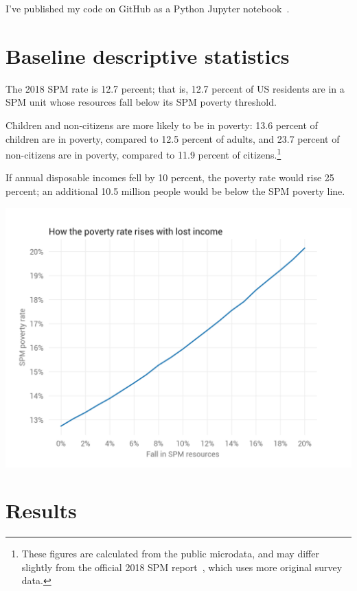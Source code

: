 \documentclass[12pt]{article}
\begin{document}
I've published my code on GitHub as a Python Jupyter notebook~\cite{notebook}.


\section{Baseline descriptive statistics} \label{sec:baseline_descriptive_statistics}

The 2018 SPM rate is 12.7 percent; that is, 12.7 percent of US residents are in a SPM unit whose resources fall below its SPM poverty threshold.

Children and non-citizens are more likely to be in poverty: 13.6 percent of children are in poverty, compared to 12.5 percent of adults, and 23.7 percent of non-citizens are in poverty, compared to 11.9 percent of citizens.\footnote{These figures are calculated from the public microdata, and may differ slightly from the official 2018 SPM report~\cite{spm}, which uses more original survey data.}

If annual disposable incomes fell by 10 percent, the poverty rate would rise 25 percent; an additional 10.5 million people would be below the SPM poverty line.

\begin{center}
\includegraphics[width=15cm]{pov_rate_income}
\label{fig:pov_rate_income}
\end{center}


\section{Results} \label{sec:results}
\end{document}

